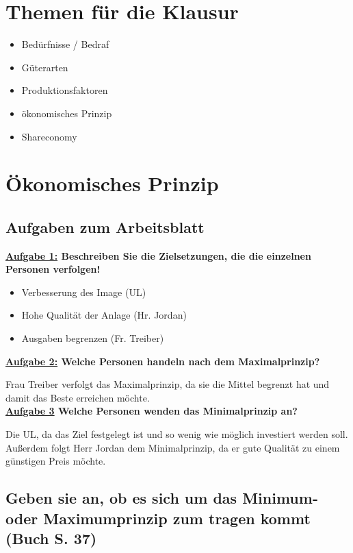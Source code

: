 \documentclass[a4paper,11pt]{scrartcl}		%
\author{Lars Friedrichsen}
\date{\today}
\begin{document}
\section{Themen für die Klausur}

	\begin{itemize}
		\item Bedürfnisse / Bedraf
		\item Güterarten
		\item Produktionsfaktoren
		\item ökonomisches Prinzip
		\item Shareconomy
	\end{itemize}

\section{Ökonomisches Prinzip}

	\subsection{Aufgaben zum Arbeitsblatt}

	\textbf{\underline{Aufgabe 1:} Beschreiben Sie die Zielsetzungen, die die einzelnen Personen verfolgen!}

		\begin{itemize}
			\item Verbesserung des Image (UL)
			\item Hohe Qualität der Anlage (Hr. Jordan)
			\item Ausgaben begrenzen (Fr. Treiber)
		\end{itemize}

	\textbf{\underline{Aufgabe 2:} Welche Personen handeln nach dem Maximalprinzip?}\par
	Frau Treiber verfolgt das Maximalprinzip, da sie die Mittel begrenzt hat und damit das Beste erreichen möchte.\\[0.5cm]

	\textbf{\underline{Aufgabe 3} Welche Personen wenden das Minimalprinzip an?}\par
	Die UL, da das Ziel festgelegt ist und so wenig wie möglich investiert werden soll. Außerdem folgt Herr Jordan dem 
	Minimalprinzip, da er gute Qualität zu einem günstigen Preis möchte.

	\subsection{Geben sie an, ob es sich um das Minimum- oder Maximumprinzip zum tragen kommt (Buch S. 37)}
\end{document}
